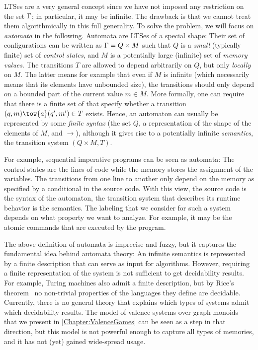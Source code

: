 \documentclass[../../diss.tex]{subfiles}
\begin{document}
LTSes are a very general concept since we have not imposed any restriction on the set $\Gamma$; in particular, it may be infinite.
The drawback is that we cannot treat them algorithmically in this full generality.
%
To solve the problem, we will focus on \emph{automata} in the following.
Automata are LTSes of a special shape:
Their set of configurations can be written as $\Gamma = Q \times M$ such that $Q$ is a \emph{small} (typically finite) set of \emph{control states}, and $M$ is a potentially large (\eg infinite) set of \emph{memory values}.
The transitions $T$ are allowed to depend arbitrarily on $Q$, but only \emph{locally} on $M$.
The latter means for example that even if $M$ is infinite (which necessarily means that its elements have unbounded size), the transitions should only depend on a bounded part of the current value $m \in M$.
More formally, one can require that there is a finite set of  that specify whether a transition $(q,m) \tow{a} (q',m') \in T$ exists.
Hence, an automaton can usually be represented by some \emph{finite syntax} (the set $Q$, a representation of the shape of the elements of $M$, and $\to$), although it gives rise to a potentially infinite \emph{semantics}, the transition system $(Q \times M, T)$.

For example, sequential imperative programs can be seen as automata:
The control states are the lines of code while the memory stores the assignment of the variables.
The transitions from one line to another only depend on the memory as specified \eg by a conditional in the source code.
With this view, the source code is the syntax of the automaton, the transition system that describes its runtime behavior is the semantics.
The labeling that we consider for such a system depends on what property we want to analyze.
For example, it may be the atomic commands that are executed by the program.

The above definition of automata is imprecise and fuzzy, but it captures the fundamental idea behind automata theory:
An infinite semantics is represented by a finite description that can serve as input for algorithms.
%
However, requiring a finite representation of the system is not sufficient to get decidability results.
For example, Turing machines also admit a finite description, but by Rice's  theorem~\cite{Rice53} no non-trivial properties of the languages they define are decidable.
Currently, there is no general theory that explains which types of systems admit which decidability results.
The model of valence systems over graph monoids~\cite{Zetzsche15d,Charney07} that we present in \cref{Chapter:ValenceGames} can be seen as a step in that direction, but this model is not powerful enough to capture all types of memories, and it has not (yet) gained wide-spread usage.
\end{document}
